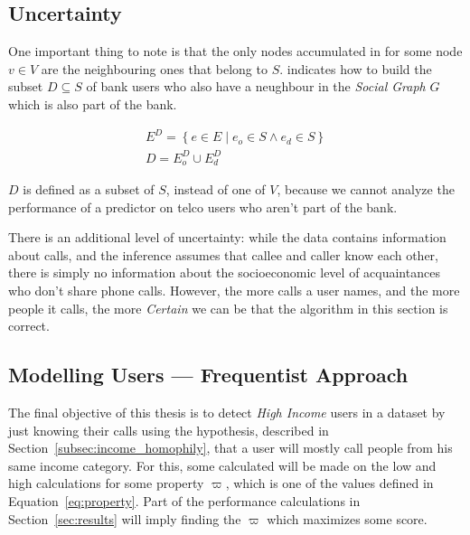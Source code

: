 \subsection{Uncertainty}
\label{subsec:uncertainty}

One important thing to note is that the only nodes accumulated in  for some node $v \in V$ are the neighbouring ones that belong to $S$.  indicates how to build the subset $D \subseteq S$ of bank users who also have a neughbour in the \emph{Social Graph} $G$ which is also part of the bank.

\begin{equation}
\label{eq:subset_neighbours}
\begin{gathered}
E^D = \left\{ e \in E \mid e_o \in S \land e_d \in S \right\} \\
D = E^D_o \cup E^D_d
\end{gathered}
\end{equation}

$D$ is defined as a subset of $S$, instead of one of $V$, because we cannot analyze the performance of a predictor on telco users who aren't part of the bank.

There is an additional level of uncertainty: while the data contains information about calls, and the inference assumes that callee and caller know each other, there is simply no information about the socioeconomic level of acquaintances who don't share phone calls. However, the more calls a user names, and the more people it calls, the more \emph{Certain} we can be that the algorithm in this section is correct.

\subsection{Modelling Users --- Frequentist Approach}
\label{subsec:modelling_users_frequentist}

The final objective of this thesis is to detect \emph{High Income} users in a dataset by just knowing their calls using the hypothesis, described in Section~\ref{subsec:income_homophily}, that a user will mostly call people from his same income category. For this, some calculated will be made on the low and high calculations for some property $\varpi$\footnotemark{}, which is one of the values defined in Equation~\ref{eq:property}. Part of the performance calculations in Section~\ref{sec:results} will imply finding the $\varpi$ which maximizes some score.

